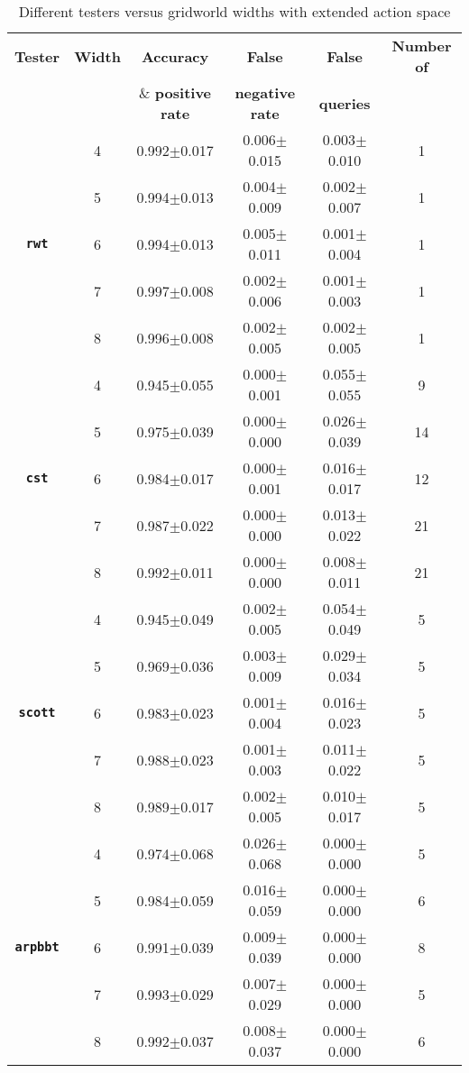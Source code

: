 \begin{table}[!ht]
    
    \caption{Different testers versus gridworld widths with extended action space}
  \label{tab:diag_exp}
  \centering
  \begin{tabular}{cccccc}
  \\
    \toprule
    \textbf{Tester}& \textbf{Width}& \textbf{Accuracy} & \textbf{False} & \textbf{False} & \textbf{Number of} \\
    & & \& \textbf{positive rate} & \textbf{negative rate} & \textbf{queries} \\
    \midrule
     & 4 & 0.992$\pm$0.017&	0.006$\pm$0.015&	0.003$\pm$0.010&	1\\
     & 5 & 0.994$\pm$0.013&	0.004$\pm$0.009&	0.002$\pm$0.007&	1\\
     \textbf{\texttt{rwt}}& 6 & 0.994$\pm$0.013&	0.005$\pm$0.011&	0.001$\pm$0.004&	1\\
     & 7 & 0.997$\pm$0.008&	0.002$\pm$0.006&	0.001$\pm$0.003&	1\\
     & 8 & 0.996$\pm$0.008&	0.002$\pm$0.005&	0.002$\pm$0.005&	1\\
     \midrule
     & 4 & 0.945$\pm$0.055&	0.000$\pm$0.001&	0.055$\pm$0.055&	9\\
     & 5 & 0.975$\pm$0.039&	0.000$\pm$0.000&	0.026$\pm$0.039&	14\\
     \textbf{\texttt{cst}}& 6 & 0.984$\pm$0.017&	0.000$\pm$0.001&	0.016$\pm$0.017&	12\\
     & 7 & 0.987$\pm$0.022&	0.000$\pm$0.000&	0.013$\pm$0.022&	21\\
     & 8 & 0.992$\pm$0.011&	0.000$\pm$0.000&	0.008$\pm$0.011&	21\\
     \midrule
      & 4 & 0.945$\pm$0.049&	0.002$\pm$0.005&	0.054$\pm$0.049&	5\\
     & 5 & 0.969$\pm$0.036&	0.003$\pm$0.009&	0.029$\pm$0.034&	5\\
     \textbf{\texttt{scott}}& 6 & 0.983$\pm$0.023&	0.001$\pm$0.004&	0.016$\pm$0.023&	5\\
     & 7 & 0.988$\pm$0.023&	0.001$\pm$0.003&	0.011$\pm$0.022&	5\\
     & 8 & 0.989$\pm$0.017&	0.002$\pm$0.005&	0.010$\pm$0.017&	5\\
     \midrule
      & 4 & 0.974$\pm$0.068&	0.026$\pm$0.068&	0.000$\pm$0.000&	5\\
     & 5 & 0.984$\pm$0.059&	0.016$\pm$0.059&	0.000$\pm$0.000&	6\\
     \textbf{\texttt{arpbbt}}& 6 & 0.991$\pm$0.039&	0.009$\pm$0.039&	0.000$\pm$0.000&	8\\
     & 7 & 0.993$\pm$0.029&	0.007$\pm$0.029&	0.000$\pm$0.000&	5\\
     & 8 & 0.992$\pm$0.037&	0.008$\pm$0.037&	0.000$\pm$0.000&	6\\
\bottomrule
    \end{tabular}
\end{table}


